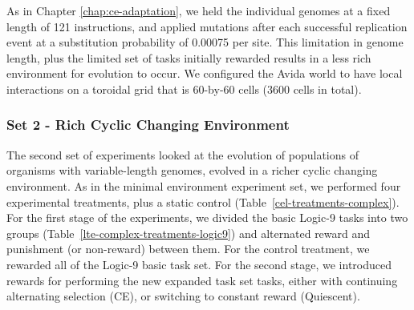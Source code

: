 \documentclass[PhD]{msu-thesis}
\begin{document}
As in Chapter \ref{chap:ce-adaptation}, we held the individual genomes at a fixed length of 121 instructions, and applied mutations after each successful replication event at a substitution probability of 0.00075 per site. This limitation in genome length, plus the limited set of tasks initially rewarded results in a less rich environment for evolution to occur.  
We configured the Avida world to have local interactions on a toroidal grid that is 60-by-60 cells (3600 cells in total).

\subsubsection{Set 2 - Rich Cyclic Changing Environment}
The second set of experiments looked at the evolution of populations of organisms with variable-length genomes, 
evolved in a richer cyclic changing environment. As in the minimal environment experiment set, we performed four experimental treatments, plus a static control (Table~\ref{cel-treatments-complex}). For the first stage of the experiments, we divided the basic Logic-9 tasks into two groups (Table~\ref{lte-complex-treatments-logic9}) and alternated reward and punishment (or non-reward) between them. For the control treatment, we rewarded all of the Logic-9 basic task set. For the second stage, we introduced rewards for performing the new expanded task set tasks, either with continuing alternating selection (CE), or switching to constant reward (Quiescent). 
\end{document}
